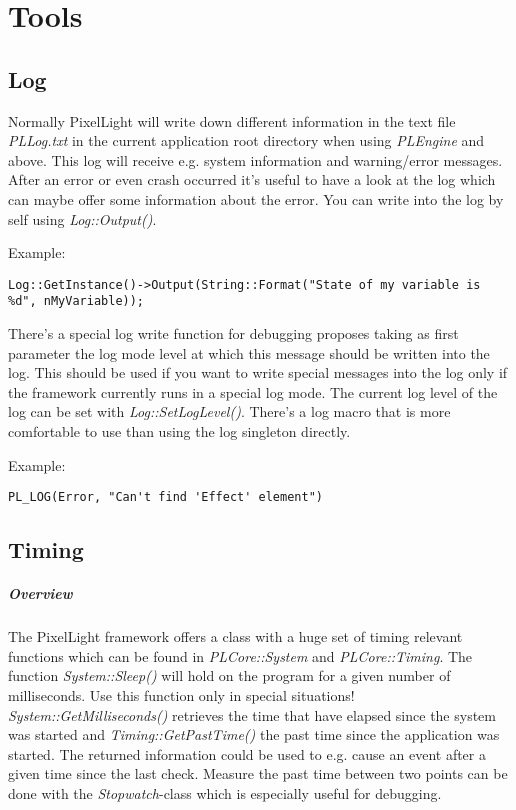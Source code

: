 \chapter{Tools}




\section{Log}
Normally PixelLight will write down different information in the text file \emph{PLLog.txt} in the current application root directory when using \emph{PLEngine} and above. This log will receive e.g. system information and warning/error messages. After an error or even crash occurred it's useful to have a look at the log which can maybe offer some information about the error. You can write into the log by self using \emph{Log::Output()}.

Example:

\begin{lstlisting}[caption=Using the log singleton directly]
Log::GetInstance()->Output(String::Format("State of my variable is %d", nMyVariable));
\end{lstlisting}

There's a special log write function for debugging proposes taking as first parameter the log mode level at which this message should be written into the log. This should be used if you want to write special messages into the log only if the framework currently runs in a special log mode. The current log level of the log can be set with \emph{Log::SetLogLevel()}. There's a log macro that is more comfortable to use than using the log singleton directly.

Example:

\begin{lstlisting}[caption=Using the log singleton though the log macros]
PL_LOG(Error, "Can't find 'Effect' element")
\end{lstlisting}





\section{Timing}


\paragraph{Overview}
The PixelLight framework offers a class with a huge set of timing relevant functions which can be found in \emph{PLCore::System} and \emph{PLCore::Timing}. The function \emph{System::Sleep()} will hold on the program for a given number of milliseconds. Use this function only in special situations! \emph{System::GetMilliseconds()} retrieves the time that have elapsed since the system was started and \emph{Timing::GetPastTime()} the past time since the application was started. The returned information could be used to e.g. cause an event after a given time since the last check. Measure the past time between two points can be done with the \emph{Stopwatch}-class which is especially useful for debugging.



